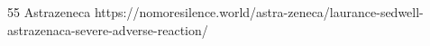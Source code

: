           {}
          {55}
          {Astrazeneca}
          {}
          {
          }
          {https://nomoresilence.world/astra-zeneca/laurance-sedwell-astrazenaca-severe-adverse-reaction/}
